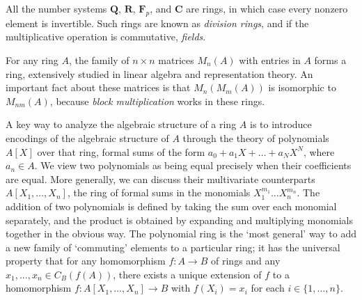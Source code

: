 \begin{example}
    All the number systems $\mathbf{Q}$, $\mathbf{R}$, $\mathbf{F}_p$, and $\mathbf{C}$ are rings, in which case every nonzero element is invertible. Such rings are known as \emph{division rings}, and if the multiplicative operation is commutative, \emph{fields}.
\end{example}

\begin{example}
    For any ring $A$, the family of $n \times n$ matrices $M_n(A)$ with entries in $A$ forms a ring, extensively studied in linear algebra and representation theory. An important fact about these matrices is that $M_n(M_m(A))$ is isomorphic to $M_{nm}(A)$, because \emph{block multiplication} works in these rings.
\end{example}

\begin{example}
    A key way to analyze the algebraic structure of a ring $A$ is to introduce encodings of the algebraic structure of $A$ through the theory of polynomials $A[X]$ over that ring, formal sums of the form $a_0 + a_1X + \dots + a_NX^N$, where $a_n \in A$. We view two polynomials as being equal precisely when their coefficients are equal. More generally, we can discuss their multivariate counterparts $A[X_1, \dots, X_n]$, the ring of formal sums in the monomials $X_1^{m_1} \dots X_n^{m_n}$. The addition of two polynomials is defined by taking the sum over each monomial separately, and the product is obtained by expanding and multiplying monomials together in the obvious way. The polynomial ring is the `most general' way to add a new family of `commuting' elements to a particular ring; it has the universal property that for any homomorphism $f: A \to B$ of rings and any $x_1, \dots, x_n \in C_B(f(A))$, there exists a unique extension of $f$ to a homomorphism $f: A[X_1, \dots, X_n] \to B$ with $f(X_i) = x_i$ for each $i \in \{ 1, \dots, n \}$.
\end{example}

